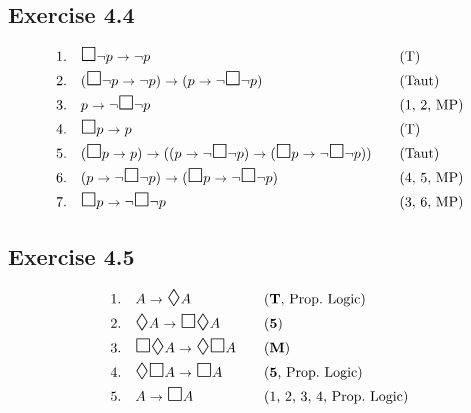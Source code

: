 \documentclass{scrartcl}
\let\oldbox\Box
\renewcommand\Box{\scaleobj{1.2}{\oldbox}}
\let\olddiamond\Diamond
\renewcommand\Diamond{\scaleobj{1.2}{\olddiamond}}
\let\oldto\to
\renewcommand\to{\scaleobj{0.95}{\,\oldto\,}}
\begin{document}
  \subsection*{Exercise 4.4}

%
%
  \begin{alignat*}{2}
    1.\quad& \Box \neg p \to \neg p &\quad& \text{(T)}\\
    2.\quad& (\Box \neg p \to \neg p) \to (p \to \neg \Box \neg p) &\quad& \text{(Taut)}\\
    3.\quad& p \to \neg \Box \neg p &\quad& \text{(1, 2, MP)}\\
    4.\quad& \Box p \to p &\quad& \text{(T)}\\
    5.\quad& (\Box p \to p) \to ((p \to \neg \Box \neg p) \to (\Box p \to \neg \Box \neg p)) &\quad& \text{(Taut)}\\
    6.\quad& (p \to \neg \Box \neg p) \to (\Box p \to \neg \Box \neg p) &\quad& \text{(4, 5, MP)}\\
    7.\quad& \Box p \to \neg \Box \neg p &\quad& \text{(3, 6, MP)}
  \end{alignat*}

  \subsection*{Exercise 4.5}

%
%
  \begin{alignat*}{2}
    1.\quad& A \to \Diamond A &\quad& \text{(\textbf{T}, Prop.\ Logic)}\\
    2.\quad& \Diamond A \to \Box \Diamond A &\quad& \text{(\textbf{5})}\\
    3.\quad& \Box\Diamond A \to \Diamond\Box A &\quad& \text{(\textbf{M})}\\
    4.\quad& \Diamond\Box A \to \Box A &\quad& \text{(\textbf{5}, Prop.\ Logic)}\\
    5.\quad& A \to \Box A &\quad& \text{(1, 2, 3, 4, Prop.\ Logic)}
  \end{alignat*}
\end{document}
